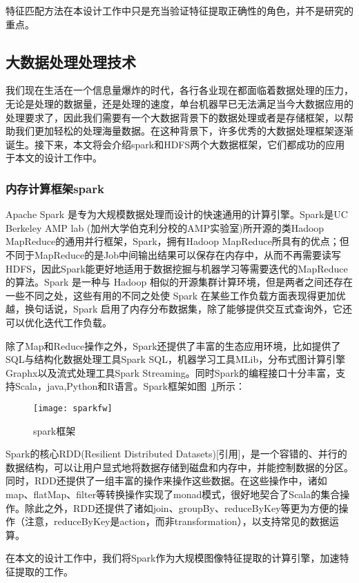 特征匹配方法在本设计工作中只是充当验证特征提取正确性的角色，并不是研究的重点。

\subsection{大数据处理处理技术}
我们现在生活在一个信息量爆炸的时代，各行各业现在都面临着数据处理的压力，无论是处理的数据量，还是处理的速度，单台机器早已无法满足当今大数据应用的处理要求了，因此我们需要有一个大数据背景下的数据处理或者是存储框架，以帮助我们更加轻松的处理海量数据。在这种背景下，许多优秀的大数据处理框架逐渐诞生。接下来，本文将会介绍spark和HDFS两个大数据框架，它们都成功的应用于本文的设计工作中。
\subsubsection{内存计算框架spark}
Apache Spark 是专为大规模数据处理而设计的快速通用的计算引擎。Spark是UC Berkeley AMP lab (加州大学伯克利分校的AMP实验室)所开源的类Hadoop MapReduce的通用并行框架，Spark，拥有Hadoop MapReduce所具有的优点；但不同于MapReduce的是Job中间输出结果可以保存在内存中，从而不再需要读写HDFS，因此Spark能更好地适用于数据挖掘与机器学习等需要迭代的MapReduce的算法。Spark 是一种与 Hadoop 相似的开源集群计算环境，但是两者之间还存在一些不同之处，这些有用的不同之处使 Spark 在某些工作负载方面表现得更加优越，换句话说，Spark 启用了内存分布数据集，除了能够提供交互式查询外，它还可以优化迭代工作负载。

除了Map和Reduce操作之外，Spark还提供了丰富的生态应用环境，比如提供了SQL与结构化数据处理工具Spark SQL，机器学习工具MLib，分布式图计算引擎Graphx以及流式处理工具Spark Streaming。同时Spark的编程接口十分丰富，支持Scala，java,Python和R语言。Spark框架如图~\ref{fig:sparkfw}所示：
\begin{figure}[htp]
\centering
\texttt{[image: sparkfw]}
\caption{spark框架}
\label{fig:sparkfw}
\end{figure}

Spark的核心RDD(Resilient Distributed Datasets)[引用]，是一个容错的、并行的数据结构，可以让用户显式地将数据存储到磁盘和内存中，并能控制数据的分区。同时，RDD还提供了一组丰富的操作来操作这些数据。在这些操作中，诸如map、flatMap、filter等转换操作实现了monad模式，很好地契合了Scala的集合操作。除此之外，RDD还提供了诸如join、groupBy、reduceByKey等更为方便的操作（注意，reduceByKey是action，而非transformation），以支持常见的数据运算。

在本文的设计工作中，我们将Spark作为大规模图像特征提取的计算引擎，加速特征提取的工作。
